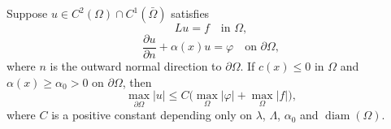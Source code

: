 \begin{theorem}\label{hanlin:maxprin-theorem-2-25}
Suppose $u \in C^2(\Omega) \cap C^1(\bar{\Omega})$ satisfies
$$
Lu = f \quad \text{in } \Omega,
$$
$$
\frac{\partial u}{\partial n} + \alpha(x)u = \varphi \quad \text{on } \partial \Omega,
$$
where $n$ is the outward normal direction to $\partial \Omega$. If $c(x) \leq 0$ in $\Omega$ and $\alpha(x) \geq \alpha_0 > 0$ on $\partial \Omega$, then
$$
\max_{\partial \Omega} |u| \leq C \bigl( \max_{\Omega} |\varphi| + \max_{\Omega} |f| \bigr),
$$
where $C$ is a positive constant depending only on $\lambda$, $\Lambda$, $\alpha_0$ and $\operatorname{diam}(\Omega)$.
\end{theorem}

